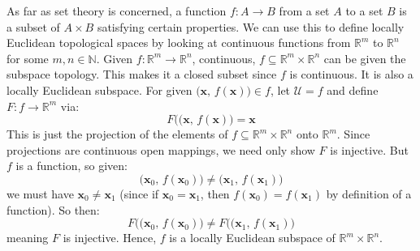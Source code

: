 \documentclass{article}
\theoremstyle{plain}
\theoremstyle{normal}
\newenvironment{example}{%
    \pushQED{\qed}\renewcommand{\qedsymbol}{$\blacksquare$}\examplex%
}{%
    \popQED\endexamplex%
}
\begin{document}
        \begin{example}
            As far as set theory is concerned, a function
            $f:A\rightarrow{B}$ from a set $A$ to a set $B$ is a subset of
            $A\times{B}$ satisfying certain properties. We can use this to
            define locally Euclidean topological spaces by looking at
            continuous functions from $\mathbb{R}^{m}$ to $\mathbb{R}^{n}$ for
            some $m,n\in\mathbb{N}$. Given
            $f:\mathbb{R}^{m}\rightarrow\mathbb{R}^{n}$, continuous,
            $f\subseteq\mathbb{R}^{m}\times\mathbb{R}^{n}$ can be given the
            subspace topology. This makes it a closed subset since $f$ is
            continuous. It is also a locally Euclidean subspace. For given
            $\big(\mathbf{x},\,f(\mathbf{x})\big)\in{f}$, let
            $\mathcal{U}=f$ and define $F:f\rightarrow\mathbb{R}^{m}$ via:
            \begin{equation}
                F\big((\mathbf{x},\,f(\mathbf{x})\big)=\mathbf{x}
            \end{equation}
            This is just the projection of the elements of
            $f\subseteq\mathbb{R}^{m}\times\mathbb{R}^{n}$ onto
            $\mathbb{R}^{m}$. Since projections are continuous open mappings,
            we need only show $F$ is injective. But $f$ is a function, so given:
            \begin{equation}
                \big(\mathbf{x}_{0},\,f(\mathbf{x}_{0})\big)
                \ne\big(\mathbf{x}_{1},\,f(\mathbf{x}_{1})\big)
            \end{equation}
            we must have $\mathbf{x}_{0}\ne\mathbf{x}_{1}$ (since if
            $\mathbf{x}_{0}=\mathbf{x}_{1}$, then
            $f(\mathbf{x}_{0})=f(\mathbf{x}_{1})$ by definition of a function).
            So then:
            \begin{equation}
                F\big((\mathbf{x}_{0},\,f(\mathbf{x}_{0})\big)
                \ne{F}\big((\mathbf{x}_{1},\,f(\mathbf{x}_{1})\big)
            \end{equation}
            meaning $F$ is injective. Hence, $f$ is a locally Euclidean subspace
            of $\mathbb{R}^{m}\times\mathbb{R}^{n}$.
        \end{example}
\end{document}
